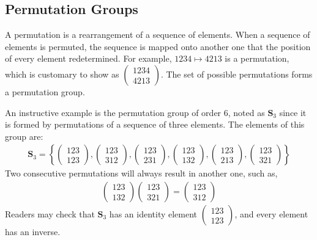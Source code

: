 \subsection{Permutation Groups}
A permutation is a rearrangement of a sequence of elements. When a sequence of elements is permuted, the sequence is mapped onto another one that the position of every element redetermined. 
\cite{rosen_symmetry_1995} For example, $1234 \mapsto 4213$ is a permutation, which is customary to show as $\left( \begin{matrix} 1234 \\ 4213 \end{matrix} \right)$. The set of possible permutations forms a permutation group. 

\begin{example}
\label{ex:p_3}
An instructive example is the permutation group of order 6, noted as $\mathbf{S}_3$ since it is formed by permutations of a sequence of three elements. The elements of this group are:
\begin{align}
\mathbf{S}_3 =\left\lbrace\left(\begin{matrix}123\\123\end{matrix}\right),\left(\begin{matrix}123\\312\end{matrix}\right),\left(\begin{matrix}123\\231\end{matrix}\right),\left(\begin{matrix}123\\132\end{matrix}\right),\left(\begin{matrix}123\\213\end{matrix}\right),\left(\begin{matrix}123\\321\end{matrix}\right)\right\rbrace
\end{align}
Two consecutive permutations will always result in another one, such as,
\begin{align}
\left(\begin{matrix}123\\132\end{matrix}\right)\left(\begin{matrix}123\\321\end{matrix}\right) = 
\left(\begin{matrix}123\\312\end{matrix}\right)
\end{align}
Readers may check that $\mathbf{S}_3$ has an identity element $\left(\begin{matrix}123\\123\end{matrix}\right)$, and every element has an inverse.
\end{example}

